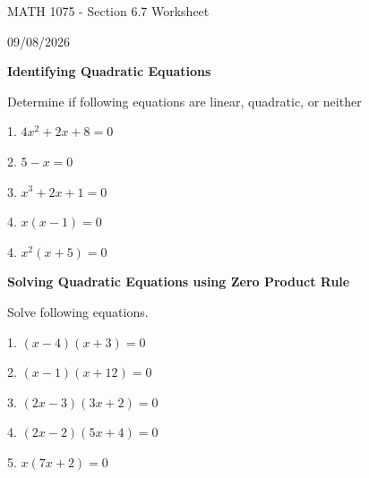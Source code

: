 \documentclass[12pt]{article}
\begin{document}
\vspace*{0.5in}

\begin{center}
    {\LARGE MATH 1075 - Section 6.7 Worksheet}

    \vspace{2em}

    {\large 09/08/2026}
\end{center}

\vspace{2em}

\textbf{\large Identifying Quadratic Equations}

\vspace{1.5em}
Determine if following equations are linear, quadratic, or neither
\vspace{1.5em}

1. $4x^{2}+2x+8=0$

\vspace{4.5em}

2. $5-x=0$

\vspace{4.5em}

3. $x^{3}+2x+1=0$

\vspace{4.5em}

4. $x(x-1)=0$

\vspace{4.5em}

4. $x^{2}(x+5)=0$

\newpage

\textbf{\large Solving Quadratic Equations using Zero Product Rule}

\vspace{1.5em}

Solve following equations.

\vspace{1.5em}

1. $(x-4)(x+3)=0$

\vspace{4.5em}
2. $(x-1)(x+12)=0$

\vspace{4.5em}
3. $(2x-3)(3x+2)=0$

\vspace{4.5em}
4. $(2x-2)(5x+4)=0$

\vspace{4.5em}
5. $x(7x+2)=0$

\vspace{4.5em}

\newpage
\end{document}
